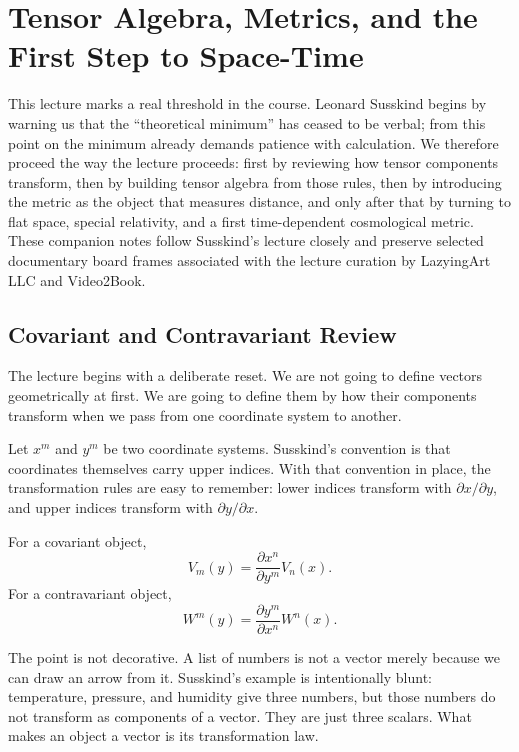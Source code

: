 \chapter{Tensor Algebra, Metrics, and the First Step to Space-Time}

This lecture marks a real threshold in the course. Leonard Susskind begins by warning us that the ``theoretical minimum'' has ceased to be verbal; from this point on the minimum already demands patience with calculation. We therefore proceed the way the lecture proceeds: first by reviewing how tensor components transform, then by building tensor algebra from those rules, then by introducing the metric as the object that measures distance, and only after that by turning to flat space, special relativity, and a first time-dependent cosmological metric. These companion notes follow Susskind's lecture closely and preserve selected documentary board frames associated with the lecture curation by LazyingArt LLC and Video2Book.

\section{Covariant and Contravariant Review}

The lecture begins with a deliberate reset. We are not going to define vectors geometrically at first. We are going to define them by how their components transform when we pass from one coordinate system to another.

Let \(x^m\) and \(y^m\) be two coordinate systems. Susskind's convention is that coordinates themselves carry upper indices. With that convention in place, the transformation rules are easy to remember: lower indices transform with \(\partial x/\partial y\), and upper indices transform with \(\partial y/\partial x\).

For a covariant object,
\begin{equation}
V_m(y)=\frac{\partial x^n}{\partial y^m}V_n(x).
\end{equation}
For a contravariant object,
\begin{equation}
W^m(y)=\frac{\partial y^m}{\partial x^n}W^n(x).
\end{equation}

The point is not decorative. A list of numbers is not a vector merely because we can draw an arrow from it. Susskind's example is intentionally blunt: temperature, pressure, and humidity give three numbers, but those numbers do not transform as components of a vector. They are just three scalars. What makes an object a vector is its transformation law.

